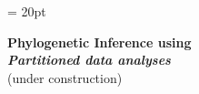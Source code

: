 \documentclass[11pt]{article}
\begin{document}
\renewcommand{\headrulewidth}{0.5pt}
\headsep = 20pt
\lhead{ }

\thispagestyle{plain}
\begin{center}
\renewcommand{\headrulewidth}{0.5pt}

\textbf{\LARGE Phylogenetic Inference using \RevBayes}\\\vspace{2mm}
\textbf{\it{\Large Partitioned data analyses}}\\\vspace{2mm}
\vspace{1cm}
{\Large (under construction)}
\vspace{1cm}
\end{center}

\def \ResourcePath {./}
\def \GlobalResourcePath {../}








\end{document}
